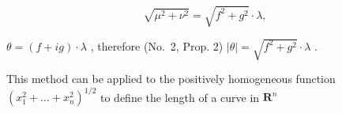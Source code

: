 \[
\sqrt {\mu^ {2} + \nu^ {2}} = \sqrt {f ^ {2} + g ^ {2}} \cdot \lambda ,
\]

\(\theta = (f + ig) \cdot \lambda\) , therefore (No.~2, Prop. 2) \(|\theta| = \sqrt{f^2 + g^2} \cdot \lambda\) .

This method can be applied to the positively homogeneous function \((x_1^2 +\ldots +x_n^2)^{1 / 2}\) to define the length of a curve in \(\mathbf{R}^n\)


